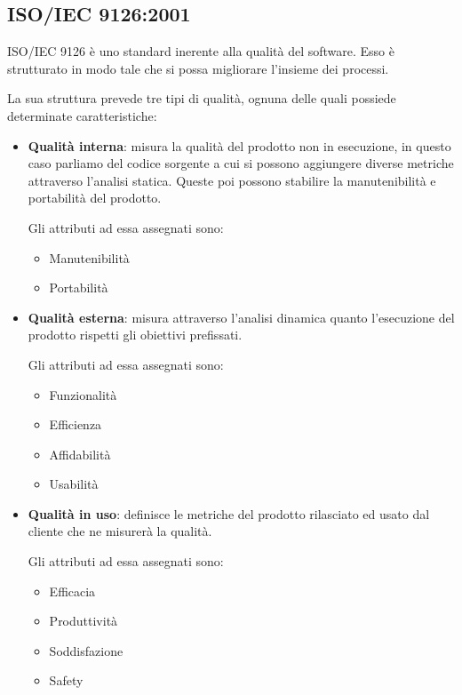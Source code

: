 	\subsection{ISO/IEC 9126:2001}
	ISO/IEC 9126 è uno standard inerente alla qualità del software. Esso è strutturato in modo tale che si possa migliorare l'insieme dei processi.

	La sua struttura prevede tre tipi di qualità, ognuna delle quali possiede determinate caratteristiche:

	\begin{itemize}
		\item \textbf{Qualità interna}: misura la qualità del prodotto non in esecuzione, in questo caso parliamo del codice sorgente a cui si possono aggiungere diverse metriche attraverso l'analisi statica. Queste poi possono stabilire la manutenibilità e portabilità del prodotto.

		Gli attributi ad essa assegnati sono:

		\begin{itemize}
			\item Manutenibilità
			\item Portabilità
		\end{itemize}

		\item \textbf{Qualità esterna}: misura attraverso l'analisi dinamica quanto l'esecuzione del prodotto rispetti gli obiettivi prefissati.

		Gli attributi ad essa assegnati sono:

			\begin{itemize}
			\item Funzionalità
			\item Efficienza
			\item Affidabilità
			\item Usabilità
		\end{itemize}

		\item \textbf{Qualità in uso}: definisce le metriche del prodotto rilasciato ed usato dal cliente che ne misurerà la qualità.

		Gli attributi ad essa assegnati sono:

		\begin{itemize}
			\item Efficacia
			\item Produttività
			\item Soddisfazione
			\item Safety
		\end{itemize}
	\end{itemize}

